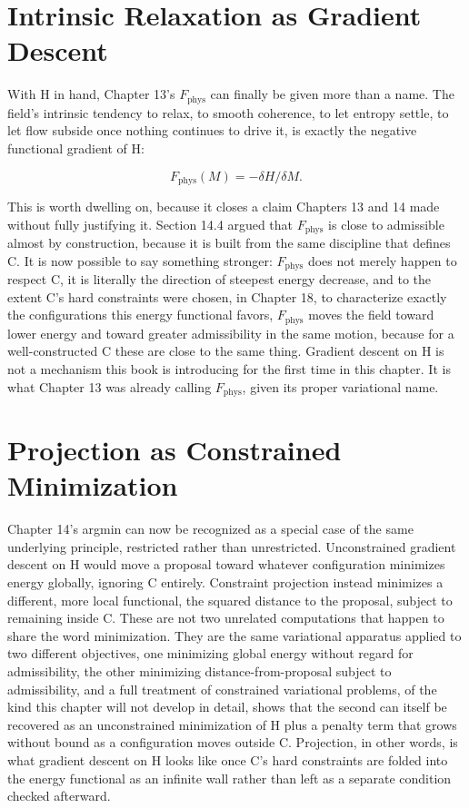 \section{Intrinsic Relaxation as Gradient Descent}

With H in hand, Chapter 13's \(F_{\mathrm{phys}}\) can finally be given more than a name. The field's intrinsic tendency to relax, to smooth coherence, to let entropy settle, to let flow subside once nothing continues to drive it, is exactly the negative functional gradient of H:

\[ F_{\mathrm{phys}}(M) = -\delta H/\delta M. \]

This is worth dwelling on, because it closes a claim Chapters 13 and 14 made without fully justifying it. Section 14.4 argued that \(F_{\mathrm{phys}}\) is close to admissible almost by construction, because it is built from the same discipline that defines C. It is now possible to say something stronger: \(F_{\mathrm{phys}}\) does not merely happen to respect C, it is literally the direction of steepest energy decrease, and to the extent C's hard constraints were chosen, in Chapter 18, to characterize exactly the configurations this energy functional favors, \(F_{\mathrm{phys}}\) moves the field toward lower energy and toward greater admissibility in the same motion, because for a well-constructed C these are close to the same thing. Gradient descent on H is not a mechanism this book is introducing for the first time in this chapter. It is what Chapter 13 was already calling \(F_{\mathrm{phys}}\), given its proper variational name.

\section{Projection as Constrained Minimization}

Chapter 14's argmin can now be recognized as a special case of the same underlying principle, restricted rather than unrestricted. Unconstrained gradient descent on H would move a proposal toward whatever configuration minimizes energy globally, ignoring C entirely. Constraint projection instead minimizes a different, more local functional, the squared distance to the proposal, subject to remaining inside C. These are not two unrelated computations that happen to share the word minimization. They are the same variational apparatus applied to two different objectives, one minimizing global energy without regard for admissibility, the other minimizing distance-from-proposal subject to admissibility, and a full treatment of constrained variational problems, of the kind this chapter will not develop in detail, shows that the second can itself be recovered as an unconstrained minimization of H plus a penalty term that grows without bound as a configuration moves outside C. Projection, in other words, is what gradient descent on H looks like once C's hard constraints are folded into the energy functional as an infinite wall rather than left as a separate condition checked afterward.

